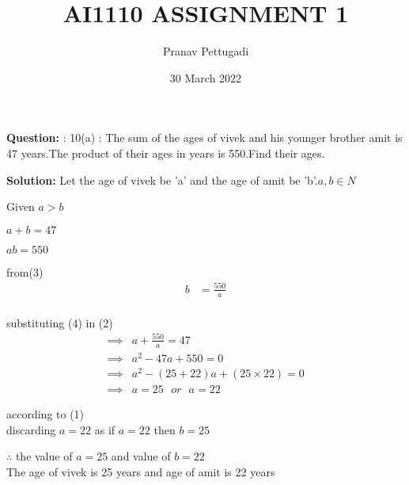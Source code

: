 \documentclass[journal,12pt,twocolumn]{IEEEtran}
\begin{document}
\newcommand{\question}{\noindent \textbf{Question: }}	
\newcommand{\solution}{\noindent \textbf{Solution: }}
\title{AI1110 ASSIGNMENT 1}
\author{Pranav Pettugadi}
\date{30 March 2022}
\maketitle

\question : 10(a) :
  The sum of the ages of vivek and his younger brother amit is 47 years.The product of their ages in years is 550.Find their ages.
  
  \solution
  Let the age of vivek be 'a' and the age of amit be 'b'.$ a,b \in N$
  
  Given
 $ a>b $
 
$ a+b=47$

 $ ab=550 $
 
 from(3)
 \begin{align*}
 b&=\frac{550}{a}\\
 \end{align*}
 
 substituting (4) in (2)
 \begin{align*}
    \implies & a+\frac{550}{a}=47\\
    \implies & a^2-47a+550=0\\
    \implies & a^2-(25+22)a+(25\times22)=0\\
    \implies & a=25 \hspace{8pt}or\hspace{8pt} a=22
\end{align*}
\begin{center}
     according to (1)\\
   discarding $a=22$ as if $a=22 $ then $b=25$ \\
\end{center}

 $ \therefore $ the value of $a=25$ and value of $b=22$ \\
The age of vivek is 25 years and age of amit is 22 years

 
\end{document}
